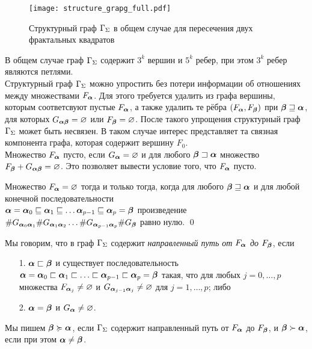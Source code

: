 \begin{figure}[h!]
    \centering
    \texttt{[image: structure\_grapg\_full.pdf]}
    \caption{Структурный граф $\Gamma_\Sigma$ в общем случае для пересечения двух фрактальных квадратов}
\end{figure}

В общем случае граф $\Gamma_\Sigma$   содержит $3^k$ вершин и $5^k$ ребер, при этом $3^k$ ребер являются петлями.\\

Структурный граф $\Gamma_\Sigma$ можно упростить без потери информации об отношениях между множествами $F_{\bm{\alpha}}$.
Для этого требуется удалить из графа вершины, которым соответсвуют пустые $F_{\bm{\alpha}}$, а также удалить те рёбра $(F_{\bm{\alpha}},F_{\bm{\beta}})$ при ${\bm{\beta}}\sqsupseteq{\bm{\alpha}}$, для которых $G_{{\bm{\alpha}}{\bm{\beta}}}=\varnothing$ или $F_{\bm{\beta}}=\varnothing$.
После такого упрощения структурный граф $\Gamma_\Sigma$ может быть несвязен.
В таком случае интерес представляет та связная компонента графа, которая содержит вершину $F_0$.\\

Множество $F_{\bm{\alpha}}$ пусто, если $G_{\bm{\alpha}}=\varnothing$ и для любого ${\bm{\beta}}\sqsupset{\bm{\alpha}}$ множество $F_{\bm{\beta}}+G_{{\bm{\alpha}}{\bm{\beta}}}=\varnothing$.
Это позволяет вывести условие того, что $F_{\bm{\alpha}}$ пусто.

\begin{lemma}
Множество $F_{\bm{\alpha}}=\varnothing$ тогда и только тогда, когда для любого ${\bm{\beta}}\sqsupseteq{\bm{\alpha}}$ и для любой конечной последовательности\\ ${\bm{\alpha}}={\bm{\alpha}}_0\sqsubseteq{\bm{\alpha}}_1\sqsubseteq\ldots {\bm{\alpha}}_{p-1}\sqsubseteq{\bm{\alpha}}_p={\bm{\beta}}$ произведение 
$\#G_{{\bm{\alpha}}_0{\bm{\alpha}}_1}\#G_{{\bm{\alpha}}_1{\bm{\alpha}}_2}\ldots  \#G_{{\bm{\alpha}}_{p-1}{\bm{\alpha}}_p}\#G_{{\bm{\beta}}}$ равно нулю. 
\qed
\end{lemma} 

\begin{definition}
Мы говорим, что в граф $\Gamma_\Sigma$  содержит  {\em направленный путь от $F_{\bm{\alpha}}$ до $F_{\bm{\beta}}$}, если 
\begin{itemize}[nolistsep]
\item[1.] ${\bm{\alpha}}\sqsubset{\bm{\beta}}$ и существует последовательность ${\bm{\alpha}}={\bm{\alpha}}_0\sqsubset{\bm{\alpha}}_1\sqsubset\ldots\sqsubset{\bm{\alpha}}_{p-1}\sqsubset{\bm{\alpha}}_p={\bm{\beta}}$ такая, что для любых  $j=0, \ldots, p$ множества $F_{{\bm{\alpha}}_j}\neq\varnothing$  и  $G_{{\bm{\alpha}}_{j-1}{\bm{\alpha}}_j}\neq\varnothing$ для $j=1, \ldots, p$; либо
\item[2.] ${\bm{\alpha}}={\bm{\beta}}$ и  $G_{{\bm{\alpha}}}\neq\varnothing$.
\end{itemize}
 Мы пишем ${\bm{\beta}}\succcurlyeq{\bm{\alpha}}$, если  $\Gamma_\Sigma$ содержит направленный путь от $F_{\bm{\alpha}}$ до $F_{\bm{\beta}}$, и ${\bm{\beta}}\succ{\bm{\alpha}}$, 
если при этом ${\bm{\alpha}}\neq{\bm{\beta}}$.
\end{definition}
 
